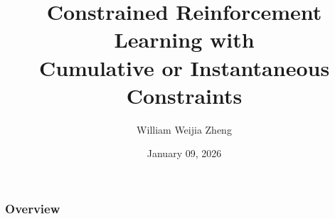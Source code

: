 \documentclass[aspectratio=43, 10pt]{beamer}
\begin{document}
\title[Safe RL]{Constrained Reinforcement Learning with \\ Cumulative or Instantaneous Constraints}
\subtitle{}
\author[ Speaker: William Weijia Zheng ]{William Weijia Zheng}

\date{January 09, 2026}

\setcounter{framenumber}{-1}
\frame{\titlepage}




\begin{frame}
\frametitle{Overview} %
\tableofcontents %
\end{frame}



  
\end{document}
